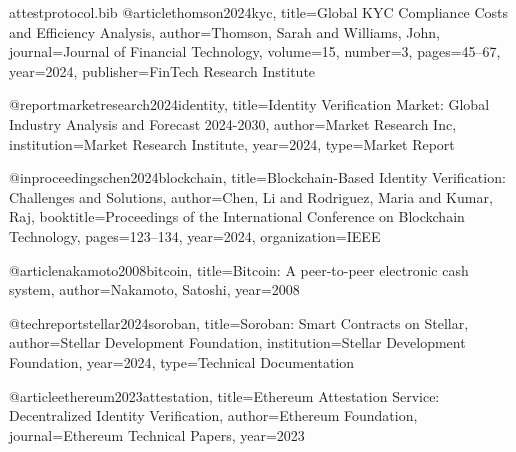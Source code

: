 \documentclass[11pt,a4paper]{article}
\begin{document}
\begin{filecontents}{attestprotocol.bib}
@article{thomson2024kyc,
  title={Global KYC Compliance Costs and Efficiency Analysis},
  author={Thomson, Sarah and Williams, John},
  journal={Journal of Financial Technology},
  volume={15},
  number={3},
  pages={45--67},
  year={2024},
  publisher={FinTech Research Institute}
}

@report{marketresearch2024identity,
  title={Identity Verification Market: Global Industry Analysis and Forecast 2024-2030},
  author={{Market Research Inc}},
  institution={Market Research Institute},
  year={2024},
  type={Market Report}
}

@inproceedings{chen2024blockchain,
  title={Blockchain-Based Identity Verification: Challenges and Solutions},
  author={Chen, Li and Rodriguez, Maria and Kumar, Raj},
  booktitle={Proceedings of the International Conference on Blockchain Technology},
  pages={123--134},
  year={2024},
  organization={IEEE}
}

@article{nakamoto2008bitcoin,
  title={Bitcoin: A peer-to-peer electronic cash system},
  author={Nakamoto, Satoshi},
  year={2008}
}

@techreport{stellar2024soroban,
  title={Soroban: Smart Contracts on Stellar},
  author={{Stellar Development Foundation}},
  institution={Stellar Development Foundation},
  year={2024},
  type={Technical Documentation}
}

@article{ethereum2023attestation,
  title={Ethereum Attestation Service: Decentralized Identity Verification},
  author={Ethereum Foundation},
  journal={Ethereum Technical Papers},
  year={2023}
}
\end{filecontents}
\end{document}
